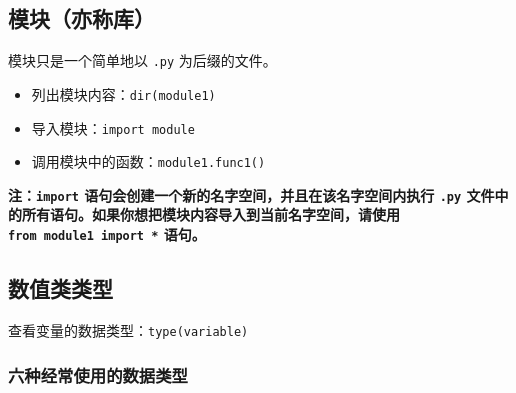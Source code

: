 \documentclass[]{ctexart}
\begin{document}
\subsection{模块（亦称库）}\label{header-n49}

模块只是一个简单地以 \texttt{.py} 为后缀的文件。

\begin{itemize}
\item
  列出模块内容：\texttt{dir(module1)}
\item
  导入模块：\texttt{import\ module}
\item
  调用模块中的函数：\texttt{module1.func1()}
\end{itemize}

\textbf{注：\texttt{import}
语句会创建一个新的名字空间，并且在该名字空间内执行 \texttt{.py}
文件中的所有语句。如果你想把模块内容导入到当前名字空间，请使用
\texttt{from\ module1\ import\ *} 语句。}

\hypertarget{header-n64}{\subsection{数值类类型}\label{header-n64}}

查看变量的数据类型：\texttt{type(variable)}

\subsubsection{六种经常使用的数据类型}\label{header-n67}
\end{document}
